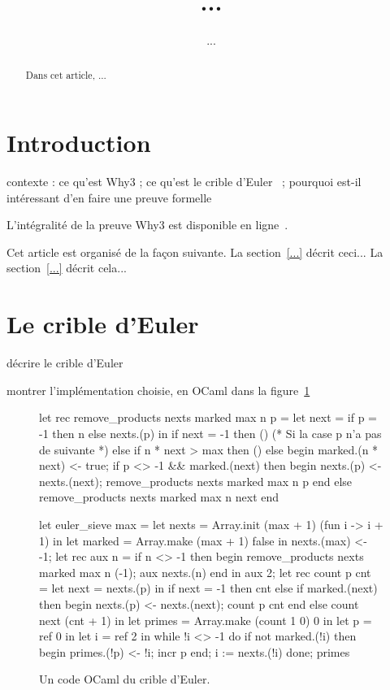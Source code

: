 \documentclass[a4paper]{easychair}
\begin{document}
\title{...}
\author{...}
\maketitle

\begin{abstract}
  Dans cet article, ...
\end{abstract}

\section{Introduction}

contexte : ce qu'est Why3 ; ce qu'est le crible d'Euler~\cite{crible-euler} ; pourquoi
est-il intéressant d'en faire une preuve formelle

L'intégralité de la preuve Why3 est disponible en ligne~\cite{mapreuve}.

Cet article est organisé de la façon suivante.
La section~\ref{...} décrit ceci...
La section~\ref{...} décrit cela...

\section{Le crible d'Euler}

décrire le crible d'Euler

montrer l'implémentation choisie, en OCaml
dans la figure~\ref{fig:codeOCaml}

\begin{figure}[tp]
\begin{ocaml}
let rec remove_products nexts marked max n p =
  let next = if p = -1 then n else nexts.(p) in
  if next = -1 then () (* Si la case p n'a pas de suivante *)
  else if n * next > max then ()
  else begin
    marked.(n * next) <- true;
    if p <> -1 && marked.(next) then begin
      nexts.(p) <- nexts.(next);
      remove_products nexts marked max n p
    end else
      remove_products nexts marked max n next
  end

let euler_sieve max =
  let nexts = Array.init (max + 1) (fun i -> i + 1) in
  let marked = Array.make (max + 1) false in
  nexts.(max) <- -1;
  let rec aux n =
    if n <> -1 then begin
      remove_products nexts marked max n (-1);
      aux nexts.(n) end in
  aux 2;
  let rec count p cnt =
    let next = nexts.(p) in
    if next = -1 then cnt
    else if marked.(next) then begin
      nexts.(p) <- nexts.(next);
      count p cnt
    end else
      count next (cnt + 1) in
  let primes = Array.make (count 1 0) 0 in
  let p = ref 0 in
  let i = ref 2 in
  while !i <> -1 do
    if not marked.(!i) then begin primes.(!p) <- !i; incr p end;
    i := nexts.(!i)
  done;
  primes
  \end{ocaml}
  \caption{Un code OCaml du crible d'Euler.}
  \label{fig:codeOCaml}
\end{figure}
\end{document}
